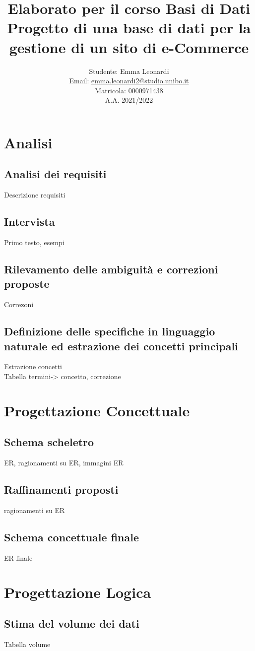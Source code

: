 \documentclass{report}
\title{Elaborato per il corso Basi di Dati\\ \small Progetto di una base di dati per la gestione di un sito di e-Commerce}
\author{
    Studente: Emma Leonardi\\
    Email: \url{emma.leonardi2@studio.unibo.it}\\
    Matricola: 0000971438\\
    A.A. 2021/2022
    }
\date{}
\begin{document}
\maketitle
\tableofcontents

\chapter{Analisi}
\section{Analisi dei requisiti}
Descrizione requisiti
\section{Intervista}
Primo testo, esempi 
\section{Rilevamento delle ambiguità e correzioni proposte}
Correzoni
\section{Definizione delle specifiche in linguaggio naturale ed estrazione dei concetti principali}
Estrazione concetti\\
Tabella termini-> concetto, correzione

\chapter{Progettazione Concettuale}
\section{Schema scheletro}
ER, ragionamenti su ER, immagini ER
\section{Raffinamenti proposti}
ragionamenti su ER
\section{Schema concettuale finale}
ER finale

\chapter{Progettazione Logica}
\section{Stima del volume dei dati}
Tabella volume
\end{document}
